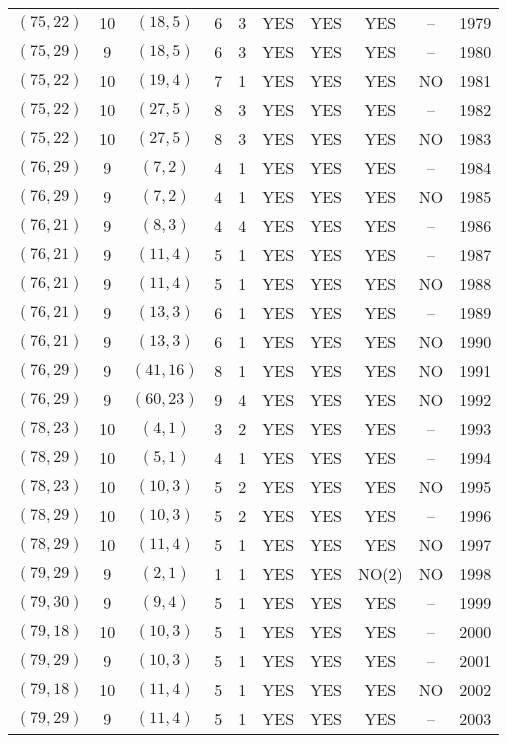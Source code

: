 \begin{longtable}{|c|c|c|c|c|c|c|c|c|c|}
$(75, 22)$ & 10 & $(18, 5)$ & 6 & 3 & YES & YES & YES & -- & 1979\\
$(75, 29)$ & 9 & $(18, 5)$ & 6 & 3 & YES & YES & YES & -- & 1980\\
$(75, 22)$ & 10 & $(19, 4)$ & 7 & 1 & YES & YES & YES & NO & 1981\\
$(75, 22)$ & 10 & $(27, 5)$ & 8 & 3 & YES & YES & YES & -- & 1982\\
$(75, 22)$ & 10 & $(27, 5)$ & 8 & 3 & YES & YES & YES & NO & 1983\\
$(76, 29)$ & 9 & $(7, 2)$ & 4 & 1 & YES & YES & YES & -- & 1984\\
$(76, 29)$ & 9 & $(7, 2)$ & 4 & 1 & YES & YES & YES & NO & 1985\\
$(76, 21)$ & 9 & $(8, 3)$ & 4 & 4 & YES & YES & YES & -- & 1986\\
$(76, 21)$ & 9 & $(11, 4)$ & 5 & 1 & YES & YES & YES & -- & 1987\\
$(76, 21)$ & 9 & $(11, 4)$ & 5 & 1 & YES & YES & YES & NO & 1988\\
$(76, 21)$ & 9 & $(13, 3)$ & 6 & 1 & YES & YES & YES & -- & 1989\\
$(76, 21)$ & 9 & $(13, 3)$ & 6 & 1 & YES & YES & YES & NO & 1990\\
$(76, 29)$ & 9 & $(41, 16)$ & 8 & 1 & YES & YES & YES & NO & 1991\\
$(76, 29)$ & 9 & $(60, 23)$ & 9 & 4 & YES & YES & YES & NO & 1992\\
$(78, 23)$ & 10 & $(4, 1)$ & 3 & 2 & YES & YES & YES & -- & 1993\\
$(78, 29)$ & 10 & $(5, 1)$ & 4 & 1 & YES & YES & YES & -- & 1994\\
$(78, 23)$ & 10 & $(10, 3)$ & 5 & 2 & YES & YES & YES & NO & 1995\\
$(78, 29)$ & 10 & $(10, 3)$ & 5 & 2 & YES & YES & YES & -- & 1996\\
$(78, 29)$ & 10 & $(11, 4)$ & 5 & 1 & YES & YES & YES & NO & 1997\\
$(79, 29)$ & 9 & $(2, 1)$ & 1 & 1 & YES & YES & NO(2) & NO & 1998\\
$(79, 30)$ & 9 & $(9, 4)$ & 5 & 1 & YES & YES & YES & -- & 1999\\
$(79, 18)$ & 10 & $(10, 3)$ & 5 & 1 & YES & YES & YES & -- & 2000\\
$(79, 29)$ & 9 & $(10, 3)$ & 5 & 1 & YES & YES & YES & -- & 2001\\
$(79, 18)$ & 10 & $(11, 4)$ & 5 & 1 & YES & YES & YES & NO & 2002\\
$(79, 29)$ & 9 & $(11, 4)$ & 5 & 1 & YES & YES & YES & -- & 2003\\

\end{longtable}
